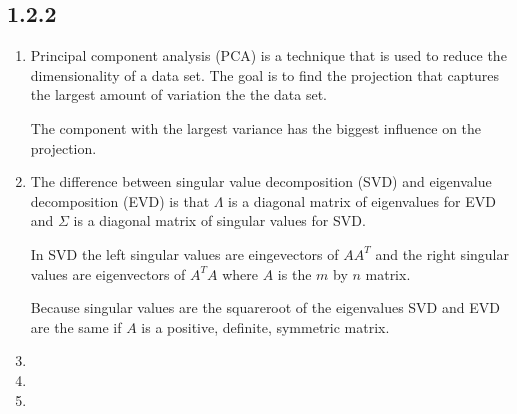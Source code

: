 \documentclass[12pt]{article}
\begin{document}
\subsection*{1.2.2}
\begin{enumerate}[a]
	\item %
	Principal component analysis (PCA) is a technique that is used to reduce the dimensionality of a data set. The goal is to find the projection that captures the largest amount of variation the the data set.

	The component with the largest variance has the biggest influence on the projection.

	\item %
	The difference between singular value decomposition (SVD) and eigenvalue decomposition (EVD) is that $\Lambda$ is a diagonal matrix of eigenvalues for EVD and $\Sigma$ is a diagonal matrix of singular values for SVD.

	In SVD the left singular values are eingevectors of $AA^T$ and the right singular values are eigenvectors of $A^TA$ where $A$ is the $m$ by $n$ matrix.

	Because singular values are the squareroot of the eigenvalues SVD and EVD are the same if $A$ is a positive, definite, symmetric matrix.

	\item %
	\item %
	\item %
\end{enumerate}
\end{document}
